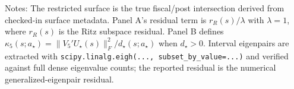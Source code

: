 \begin{table}[!htbp]
{\begin{tabular}{@{}lrrrrrr@{}}
\bottomrule
\end{tabular}
}
\begin{minipage}{0.96\linewidth}
\footnotesize Notes: The restricted surface is the true fiscal/post intersection derived from checked-in surface metadata. Panel A's residual term is $r_R(s)/\lambda$ with $\lambda=1$, where $r_R(s)$ is the Ritz subspace residual. Panel B defines $\kappa_5(s;a_\star)=\|V_5'U_\star(s)\|_F^2/d_\star(s;a_\star)$ when $d_\star>0$. Interval eigenpairs are extracted with \texttt{scipy.linalg.eigh(..., subset\_by\_value=...)} and verified against full dense eigenvalue counts; the reported residual is the numerical generalized-eigenpair residual.
\end{minipage}
\end{table}
